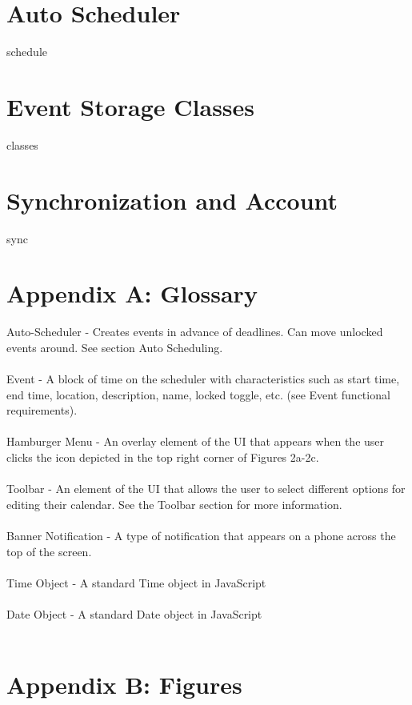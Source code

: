 \documentclass{scrreprt}
\begin{document}
\chapter{Auto Scheduler}

schedule

\chapter{Event Storage Classes}

classes

\chapter{Synchronization and Account}

sync

\chapter{Appendix A: Glossary}
Auto-Scheduler - Creates events in advance of deadlines. Can move unlocked events around. See section Auto Scheduling.\\
\\
Event - A block of time on the scheduler with characteristics such as start time, end time,
location, description, name, locked toggle, etc. (see Event functional requirements).\\
\\
Hamburger Menu - An overlay element of the UI that appears when the user clicks the icon depicted in the top right corner of Figures 2a-2c.\\
\\
Toolbar - An element of the UI that allows the user to select different options for editing their calendar.  See the Toolbar section for more information. \\
\\
Banner Notification - A type of notification that appears on a phone across the top of the screen. \\
\\
Time Object - A standard Time object in JavaScript \\
\\
Date Object - A standard Date object in JavaScript \\
\\
\chapter{Appendix B: Figures}
\end{document}
